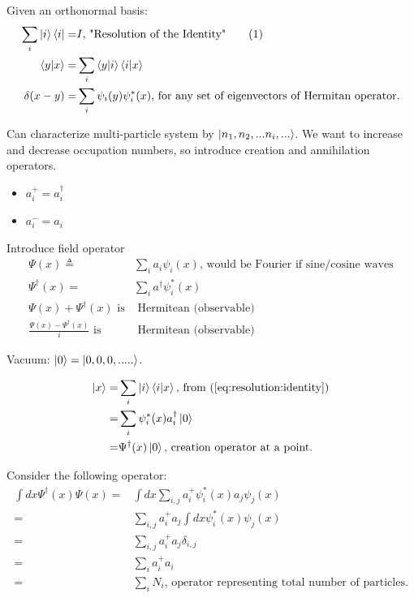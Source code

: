 \documentclass[]{article}
\newcommand\numberthis{\addtocounter{equation}{1}\tag{\theequation}}
\begin{document}
Given an orthonormal basis:
\begin{align*}
\sum_{i} \ket{i} \bra{i} =& I \text{, "Resolution of the Identity"}\numberthis \label{eq:resolution:identity}\\
\braket{y|x}=& \sum_{i} \braket{y|i} \braket{i|x}\\
\delta(x-y)=& \sum_{i} \psi_i(y) \psi^*_i(x)\text{, for any set of eigenvectors of Hermitan operator.}
\end{align*}

Can characterize multi-particle system by $\ket{n_1, n_2,...n_i,...}$. We want to increase and decrease occupation numbers, so introduce creation and annihilation operators.

\begin{itemize}
	\item $a^+_i=a^\dagger_i$
	\item $a^-_i=a_i$
\end{itemize} 

Introduce field operator
\begin{align*}
\Psi(x) \triangleq & \sum_{i} a_i \psi_i(x) \text{, would be Fourier if sine/cosine waves}\\
\Psi^\dagger(x) =& \sum_{i} a^\dagger \psi^*_i(x)\\
\Psi(x) + \Psi^\dagger(x) \text{ is}& \text{ Hermitean (observable)}\\
\frac{\Psi(x) - \Psi^\dagger(x)}{i} \text{ is}& \text{ Hermitean (observable)}
\end{align*}

Vacuum: $\ket{0} = \ket{0,0,0,.....}$.

\begin{align*}
\ket{x}=&\sum_{i}\ket{i}\braket{i|x}\text{, from (\ref{eq:resolution:identity})}\\
=& \sum_i \psi^*_i(x)a^\dagger_i\ket{0}\\
=& \Psi^\dagger(x) \ket{0}\text{, creation operator at a point.}
\end{align*} 

Consider the following operator:
\begin{align*}
\int dx \Psi^\dagger(x) \Psi(x)=&\int dx \sum_{i,j}a^+_i\psi_i^*(x) a_j\psi_j(x)\\
=&\sum_{i,j} a^+_i a_j \int dx \psi_i^*(x) \psi_j(x)\\
=&\sum_{i,j} a^+_i a_j \delta_{i,j}\\
=&\sum_i a^+_i a_i\\
=&\sum_i N_i\text{, operator representing total number of particles.}
\end{align*}
\end{document}
